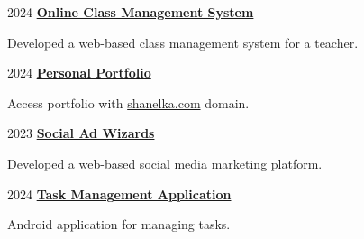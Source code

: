 
\begin{twocolentry}{
      2024
   }
   \textbf{\href{https://github.com/ShanelkaPramuditha/online-class-management-system}{\textcolor{secondaryColor}{Online Class Management System}}}
   \begin{highlights}
      \item Developed a web-based class management system for a teacher.
   \end{highlights}
\end{twocolentry}

\vspace{0.3 cm}

\begin{twocolentry}{
      2024
   }
   \textbf{\href{https://github.com/ShanelkaPramuditha/portfolio}{\textcolor{secondaryColor}{Personal Portfolio}}}
   \begin{highlights}
      \item Access portfolio with \href{https://shanelka.com}{shanelka.com} domain.
   \end{highlights}
\end{twocolentry}

\vspace{0.3 cm}

\begin{twocolentry}{
      2023
   }
   \textbf{\href{https://github.com/ShanelkaPramuditha/IWT-Project-Social-Ad-Wizards}{\textcolor{secondaryColor}{Social Ad Wizards}}}
   \begin{highlights}
      \item Developed a web-based social media marketing platform.
   \end{highlights}
\end{twocolentry}

\vspace{0.3 cm}

\begin{twocolentry}{
      2024
   }
   \textbf{\href{https://github.com/ShanelkaPramuditha/task-management-app}{\textcolor{secondaryColor}{Task Management Application}}}
   \begin{highlights}
      \item Android application for managing tasks.
   \end{highlights}
\end{twocolentry}


